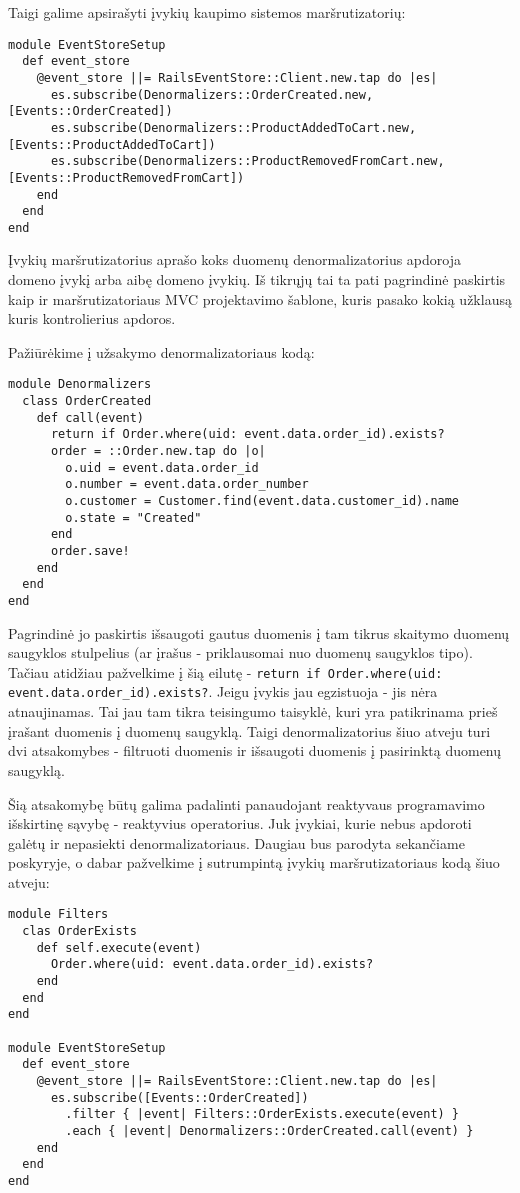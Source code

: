Taigi galime apsirašyti įvykių kaupimo sistemos maršrutizatorių:

\begin{lstlisting}
module EventStoreSetup
  def event_store
    @event_store ||= RailsEventStore::Client.new.tap do |es|
      es.subscribe(Denormalizers::OrderCreated.new, [Events::OrderCreated])
      es.subscribe(Denormalizers::ProductAddedToCart.new, [Events::ProductAddedToCart])
      es.subscribe(Denormalizers::ProductRemovedFromCart.new, [Events::ProductRemovedFromCart])
    end
  end
end
\end{lstlisting}

Įvykių maršrutizatorius aprašo koks duomenų denormalizatorius apdoroja domeno įvykį arba aibę domeno įvykių. Iš tikrųjų tai ta pati pagrindinė paskirtis kaip ir maršrutizatoriaus MVC projektavimo šablone, kuris pasako kokią užklausą kuris kontrolierius apdoros.

Pažiūrėkime į užsakymo denormalizatoriaus kodą:

\begin{lstlisting}
module Denormalizers
  class OrderCreated
    def call(event)
      return if Order.where(uid: event.data.order_id).exists?
      order = ::Order.new.tap do |o|
        o.uid = event.data.order_id
        o.number = event.data.order_number
        o.customer = Customer.find(event.data.customer_id).name
        o.state = "Created"
      end
      order.save!
    end
  end
end
\end{lstlisting}

Pagrindinė jo paskirtis išsaugoti gautus duomenis į tam tikrus skaitymo duomenų saugyklos stulpelius (ar įrašus - priklausomai nuo duomenų saugyklos tipo). Tačiau atidžiau pažvelkime į šią eilutę - \lstinline|return if Order.where(uid: event.data.order_id).exists?|. Jeigu įvykis jau egzistuoja - jis nėra atnaujinamas. Tai jau tam tikra teisingumo taisyklė, kuri yra patikrinama prieš įrašant duomenis į duomenų saugyklą. Taigi denormalizatorius šiuo atveju turi dvi atsakomybes - filtruoti duomenis ir išsaugoti duomenis į pasirinktą duomenų saugyklą.

Šią atsakomybę būtų galima padalinti panaudojant reaktyvaus programavimo išskirtinę sąvybę - reaktyvius operatorius. Juk įvykiai, kurie nebus apdoroti galėtų ir nepasiekti denormalizatoriaus. Daugiau bus parodyta sekančiame poskyryje, o dabar pažvelkime į sutrumpintą įvykių maršrutizatoriaus kodą šiuo atveju:

\begin{lstlisting}
module Filters
  clas OrderExists
    def self.execute(event)
      Order.where(uid: event.data.order_id).exists?
    end
  end
end

module EventStoreSetup
  def event_store
    @event_store ||= RailsEventStore::Client.new.tap do |es|
      es.subscribe([Events::OrderCreated])
        .filter { |event| Filters::OrderExists.execute(event) }
        .each { |event| Denormalizers::OrderCreated.call(event) }
    end
  end
end
\end{lstlisting}

